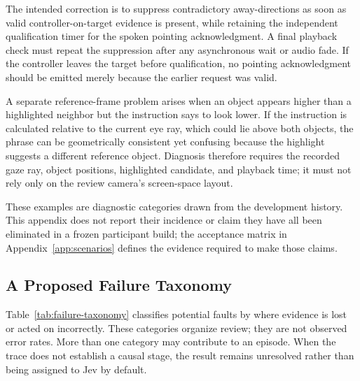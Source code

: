 The intended correction is to suppress contradictory away-directions as soon as valid controller-on-target evidence is present, while retaining the independent qualification timer for the spoken pointing acknowledgment. A final playback check must repeat the suppression after any asynchronous wait or audio fade. If the controller leaves the target before qualification, no pointing acknowledgment should be emitted merely because the earlier request was valid.

A separate reference-frame problem arises when an object appears higher than a highlighted neighbor but the instruction says to look lower. If the instruction is calculated relative to the current eye ray, which could lie above both objects, the phrase can be geometrically consistent yet confusing because the highlight suggests a different reference object. Diagnosis therefore requires the recorded gaze ray, object positions, highlighted candidate, and playback time; it must not rely only on the review camera's screen-space layout.

These examples are diagnostic categories drawn from the development history. This appendix does not report their incidence or claim they have all been eliminated in a frozen participant build; the acceptance matrix in Appendix~\ref{app:scenarios} defines the evidence required to make those claims.


\subsection{A Proposed Failure Taxonomy}
Table~\ref{tab:failure-taxonomy} classifies potential faults by where evidence is lost or acted on incorrectly. These categories organize review; they are not observed error rates. More than one category may contribute to an episode. When the trace does not establish a causal stage, the result remains unresolved rather than being assigned to Jev by default.

